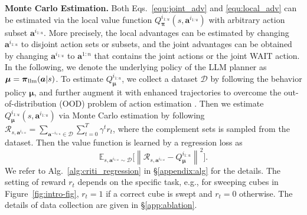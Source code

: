 \documentclass[11pt]{article}
\theoremstyle{plain}
\theoremstyle{remark}
\begin{document}
\textbf{Monte Carlo Estimation.}
Both Eqs.~\eqref{equ:joint_adv} and \eqref{equ:local_adv} can be estimated via the local value function $Q_{\boldsymbol{\pi}}^{i_{1:u}}(s,\boldsymbol{a}^{i_{1:u}})$ with arbitrary action subset $\boldsymbol{a}^{i_{1:u}}$. More precisely, the local advantages can be estimated by changing $\boldsymbol{a}^{i_{1:u}}$ to disjoint action sets or subsets, and the joint advantages can be obtained by changing $\boldsymbol{a}^{i_{1:u}}$ to $\boldsymbol{a}^{1:n}$ that contains the joint actions or the joint WAIT action.
In the following, we denote the underlying policy of the LLM planner as $\boldsymbol{\mu}=\boldsymbol{\pi}_{\rm llm}(\boldsymbol{a}|s)$. To estimate $Q_{\boldsymbol{\mu}}^{i_{1:u}}$, we collect a dataset $\mathcal{D}$ by following the behavior policy $\boldsymbol{\mu}$, and further augment it with enhanced trajectories to overcome the out-of-distribution (OOD) problem of action estimation \citep{levine2020offline}.
Then we estimate $Q_{\boldsymbol{\mu}}^{i_{1:u}}(s,\boldsymbol{a}^{i_{1:u}})$ via Monte Carlo estimation by following $\mathcal{R}_{s, \boldsymbol{a}^{i_{1:u}}} = \sum_{\boldsymbol{a}^{-i_{1:u}} \in \mathcal{D}}\sum_{t=0}^{T}\gamma^t r_t$, where the complement sets is sampled from the dataset. Then the value function is learned by a regression loss as 
\begin{equation*}
\mathbb{E}_{s, \boldsymbol{a}^{i_{1:u}} \sim \mathcal{D}} \Big[\left\| \mathcal{R}_{s, \boldsymbol{a}^{i_{1:u}}} - Q_{\boldsymbol{\mu}}^{i_{1:u}} \right\|^{2} \Big].
\end{equation*}
We refer to Alg.~\ref{alg:criti_regression} in \S\ref{appendix:alg} for the details. The setting of reward $r_t$ depends on the specific task, e.g., for sweeping cubes in Figure~\ref{fig:intro-fig}, $r_t=1$ if a correct cube is swept and $r_t=0$ otherwise. The details of data collection are given in \S\ref{app:ablation}.
\end{document}
